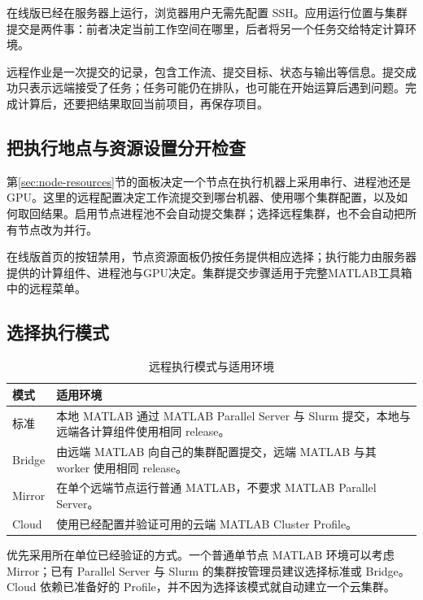 在线版已经在服务器上运行，浏览器用户无需先配置 SSH。应用运行位置与集群提交是两件事：前者决定当前工作空间在哪里，后者将另一个任务交给特定计算环境。

远程作业是一次提交的记录，包含工作流、提交目标、状态与输出等信息。提交成功只表示远端接受了任务；任务可能仍在排队，也可能在开始运算后遇到问题。完成计算后，还要把结果取回当前项目，再保存项目。

\subsection{把执行地点与资源设置分开检查}

第\ref{sec:node-resources}节的面板决定一个节点在执行机器上采用串行、进程池还是GPU。这里的远程配置决定工作流提交到哪台机器、使用哪个集群配置，以及如何取回结果。启用节点进程池不会自动提交集群；选择远程集群，也不会自动把所有节点改为并行。

在线版首页的按钮禁用，节点资源面板仍按任务提供相应选择；执行能力由服务器提供的计算组件、进程池与GPU决定。集群提交步骤适用于完整MATLAB\regmark{}工具箱中的远程菜单。

\subsection{选择执行模式}

\begin{table}[htbp]
\centering
\caption{远程执行模式与适用环境}
\begin{tabularx}{\linewidth}{lX}
\toprule
模式 & 适用环境 \\
\midrule
标准 & 本地 MATLAB\regmark{} 通过 MATLAB\regmark{} Parallel Server 与 Slurm 提交，本地与远端各计算组件使用相同 release。\\
Bridge & 由远端 MATLAB\regmark{} 向自己的集群配置提交，远端 MATLAB\regmark{} 与其 worker 使用相同 release。\\
Mirror & 在单个远端节点运行普通 MATLAB\regmark{}，不要求 MATLAB\regmark{} Parallel Server。\\
Cloud & 使用已经配置并验证可用的云端 MATLAB\regmark{} Cluster Profile。\\
\bottomrule
\end{tabularx}
\end{table}

优先采用所在单位已经验证的方式。一个普通单节点 MATLAB\regmark{} 环境可以考虑 Mirror；已有 Parallel Server 与 Slurm 的集群按管理员建议选择标准或 Bridge。Cloud 依赖已准备好的 Profile，并不因为选择该模式就自动建立一个云集群。

